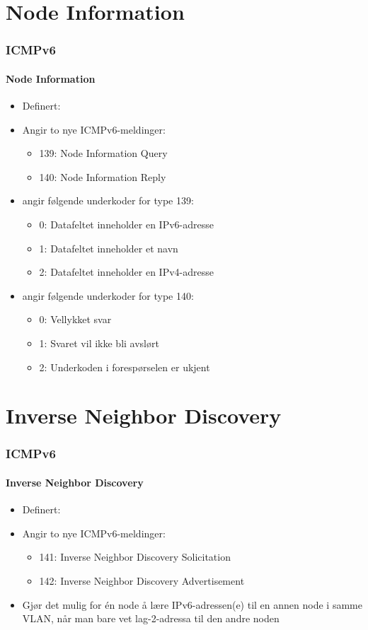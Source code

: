 \section{Node Information}
\begin{frame}%
  \frametitle{ICMPv6}
  \framesubtitle{Node Information}
  \begin{itemize}%
  \item Definert: 
  \item Angir to nye ICMPv6-meldinger:
    \begin{itemize}%
    \item 139: Node Information Query
    \item 140: Node Information Reply
    \end{itemize}
  \item {} angir
    følgende underkoder for type 139:
    \begin{itemize}%
    \item 0: Datafeltet inneholder en IPv6-adresse
    \item 1: Datafeltet inneholder et navn
    \item 2: Datafeltet inneholder en IPv4-adresse
    \end{itemize}
  \item {} angir
    følgende underkoder for type 140:
    \begin{itemize}%
    \item 0: Vellykket svar
    \item 1: Svaret vil ikke bli avslørt
    \item 2: Underkoden i forespørselen er ukjent
    \end{itemize}
  \end{itemize}
\end{frame}

\section{Inverse Neighbor Discovery}
\begin{frame}%
  \frametitle{ICMPv6}
  \framesubtitle{Inverse Neighbor Discovery}
  \begin{itemize}%
  \item Definert: 
  \item Angir to nye ICMPv6-meldinger:
    \begin{itemize}%
    \item 141: Inverse Neighbor Discovery Solicitation
    \item 142: Inverse Neighbor Discovery Advertisement
    \end{itemize}
  \item Gjør det mulig for én node å lære IPv6-adressen(e) til en
    annen node i samme VLAN, når man bare vet lag-2-adressa til den
    andre noden
  \end{itemize}
\end{frame}

